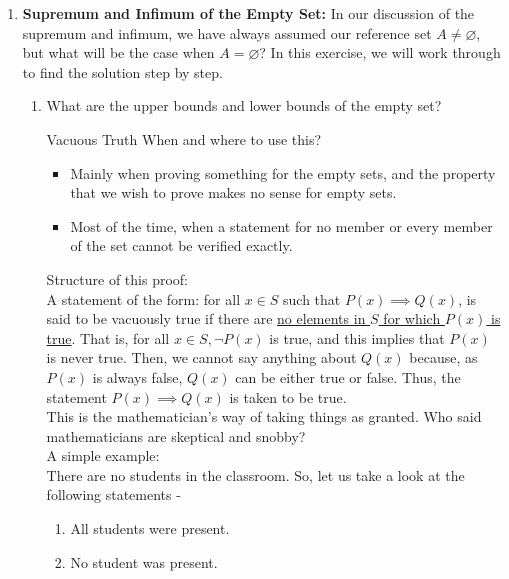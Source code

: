 \begin{enumerate}[label=\textbf{\arabic*.}]
\begin{enumerate}
    \end{enumerate}
    \item \textbf{Supremum and Infimum of the Empty Set:} In our discussion of the supremum and infimum, we have always assumed our reference set $A\neq\varnothing$, but what will be the case when $A=\varnothing$? In this exercise, we will work through to find the solution step by step.
    \begin{enumerate}
        \item What are the upper bounds and lower bounds of the empty set?
        \begin{Trick}{Vacuous Truth}\label{vacuous_truth}
            When and where to use this?
            \begin{itemize}
                \item Mainly when proving something for the empty sets, and the property that we wish to prove makes no sense for empty sets.
                \item Most of the time, when a statement for no member or every member of the set cannot be verified exactly.
            \end{itemize}
            \smallskip
            Structure of this proof:\\
            A statement of the form:  for all \(x\in S\) such that \(P(x)\implies Q(x)\), is said to be vacuously true if there are \underline{no elements in \(S\) for which \(P(x)\) is true}. That is, for all $x\in S, \neg P(x)$ is true, and this implies that $P(x)$ is never true. Then, we cannot say anything about $Q(x)$ because, as $P(x)$ is always false, $Q(x)$ can be either true or false. Thus, the statement $P(x)\implies Q(x)$ is taken to be true.\\
            This is the mathematician's way of taking things as granted. Who said mathematicians are skeptical and snobby?\\
            \newline
            A simple example:\\
            There are no students in the classroom. So, let us take a look at the following statements -
            \begin{enumerate}
                \item All students were present.
                \item No student was present.

\end{enumerate}
\end{Trick}
\end{enumerate}
\end{enumerate}
